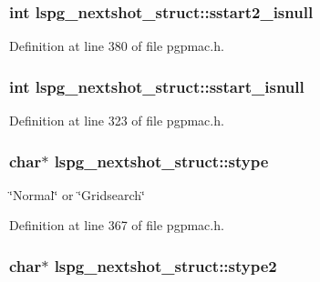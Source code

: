 \hypertarget{structlspg__nextshot__struct_a240c8532d5ce48dbc872d5123a4e721c}{
\subsubsection[{sstart2\-\_\-isnull}]{\setlength{\rightskip}{0pt plus 5cm}int lspg\-\_\-nextshot\-\_\-struct\-::sstart2\-\_\-isnull}}\label{structlspg__nextshot__struct_a240c8532d5ce48dbc872d5123a4e721c}


Definition at line 380 of file pgpmac.\-h.

\hypertarget{structlspg__nextshot__struct_aa53094de91e2f69d7174ab119df1cdac}{
\subsubsection[{sstart\-\_\-isnull}]{\setlength{\rightskip}{0pt plus 5cm}int lspg\-\_\-nextshot\-\_\-struct\-::sstart\-\_\-isnull}}\label{structlspg__nextshot__struct_aa53094de91e2f69d7174ab119df1cdac}


Definition at line 323 of file pgpmac.\-h.

\hypertarget{structlspg__nextshot__struct_ab5a70b189c2fe516ca0c84bd06f3e564}{
\subsubsection[{stype}]{\setlength{\rightskip}{0pt plus 5cm}char$\ast$ lspg\-\_\-nextshot\-\_\-struct\-::stype}}\label{structlspg__nextshot__struct_ab5a70b189c2fe516ca0c84bd06f3e564}


\char`\"{}\-Normal\char`\"{} or \char`\"{}\-Gridsearch\char`\"{} 



Definition at line 367 of file pgpmac.\-h.

\hypertarget{structlspg__nextshot__struct_ae08ef74ea76e6e099a3ff6c7f845d337}{
\subsubsection[{stype2}]{\setlength{\rightskip}{0pt plus 5cm}char$\ast$ lspg\-\_\-nextshot\-\_\-struct\-::stype2}}\label{structlspg__nextshot__struct_ae08ef74ea76e6e099a3ff6c7f845d337}


